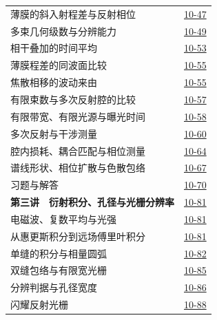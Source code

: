 \begin{longtable}{@{}p{}r@{}}
\hspace{1em}薄膜的斜入射程差与反射相位&\href{course-page:10:51}{10-47}\\[2pt]
\hspace{1em}多束几何级数与分辨能力&\href{course-page:10:53}{10-49}\\[2pt]
\hspace{1em}相干叠加的时间平均&\href{course-page:10:57}{10-53}\\[2pt]
\hspace{1em}薄膜程差的同波面比较&\href{course-page:10:59}{10-55}\\[2pt]
\hspace{1em}焦散相移的波动来由&\href{course-page:10:59}{10-55}\\[2pt]
\hspace{1em}有限束数与多次反射腔的比较&\href{course-page:10:61}{10-57}\\[2pt]
\hspace{1em}有限带宽、有限光源与曝光时间&\href{course-page:10:62}{10-58}\\[2pt]
\hspace{1em}多次反射与干涉测量&\href{course-page:10:64}{10-60}\\[2pt]
\hspace{1em}腔内损耗、耦合匹配与相位测量&\href{course-page:10:68}{10-64}\\[2pt]
\hspace{1em}谱线形状、相位扩散与色散包络&\href{course-page:10:71}{10-67}\\[2pt]
\hspace{1em}习题与解答&\href{course-page:10:74}{10-70}\\[2pt]
\textbf{第三讲　衍射积分、孔径与光栅分辨率}&\href{course-page:10:85}{10-81}\\[2pt]
\hspace{1em}电磁波、复数平均与光强&\href{course-page:10:85}{10-81}\\[2pt]
\hspace{1em}从惠更斯积分到远场傅里叶积分&\href{course-page:10:85}{10-81}\\[2pt]
\hspace{1em}单缝的积分与相量圆弧&\href{course-page:10:86}{10-82}\\[2pt]
\hspace{1em}双缝包络与有限宽光栅&\href{course-page:10:89}{10-85}\\[2pt]
\hspace{1em}分辨判据与孔径宽度&\href{course-page:10:90}{10-86}\\[2pt]
\hspace{1em}闪耀反射光栅&\href{course-page:10:92}{10-88}\\[2pt]

\end{longtable}
